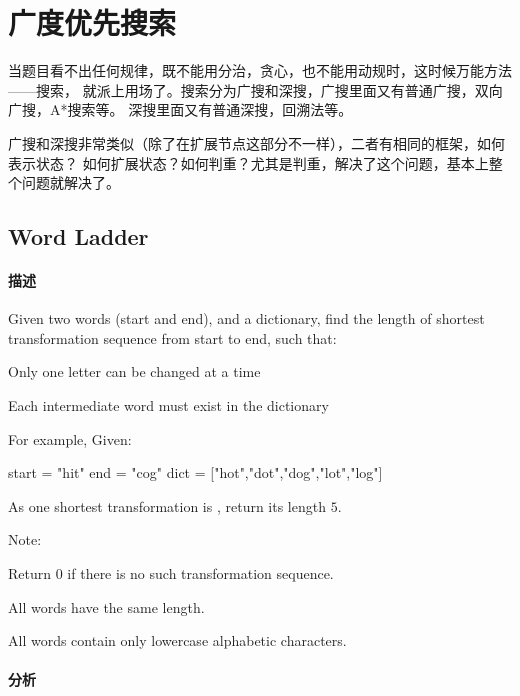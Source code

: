 \chapter{广度优先搜索}
当题目看不出任何规律，既不能用分治，贪心，也不能用动规时，这时候万能方法——搜索，
就派上用场了。搜索分为广搜和深搜，广搜里面又有普通广搜，双向广搜，A*搜索等。
深搜里面又有普通深搜，回溯法等。

广搜和深搜非常类似（除了在扩展节点这部分不一样），二者有相同的框架，如何表示状态？
如何扩展状态？如何判重？尤其是判重，解决了这个问题，基本上整个问题就解决了。


\section{Word Ladder} %
\label{sec:wordladder}


\subsubsection{描述}
Given two words (start and end), and a dictionary, find the length of shortest transformation sequence from start to end, such that:
\begindot
\item Only one letter can be changed at a time
\item Each intermediate word must exist in the dictionary
\myenddot

For example, Given:

\begin{Code}
start = "hit"
end = "cog"
dict = ["hot","dot","dog","lot","log"]
\end{Code}
As one shortest transformation is , return its length $5$.

Note:
\begindot
\item Return 0 if there is no such transformation sequence.
\item All words have the same length.
\item All words contain only lowercase alphabetic characters.
\myenddot


\subsubsection{分析}


